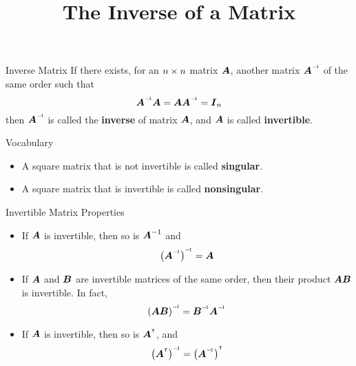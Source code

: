 \documentclass{beamer}
\title[MA245 - Section 3.3]{The Inverse of a Matrix}
\begin{document}
\begin{frame}
  \titlepage
\end{frame}

\begin{frame}
\begin{block}{Inverse Matrix}
If there exists, for an $n \times n$ matrix $\boldsymbol{A}$, another matrix $\inverseof{\mat{A}}$ of the same order such that
\begin{equation*}
\inverseof{\mat{A}}\mat{A}=\mat{A}\inverseof{\mat{A}}=\identmat{n}
\end{equation*}
then $\inverseof{\mat{A}}$ is called the \textbf{inverse} of matrix $\boldsymbol{A}$, and $\boldsymbol{A}$ is called \textbf{invertible}.
\end{block}\pause
\begin{block}{Vocabulary}
\begin{itemize}
\item A square matrix that is not invertible is called \textbf{singular}.
\item A square matrix that is invertible is called \textbf{nonsingular}.
\end{itemize}
\end{block}
\end{frame}

\begin{frame}
\begin{block}{Invertible Matrix Properties}
\begin{itemize}
\item<+-> If $\boldsymbol{A}$ is invertible, then so is $\boldsymbol{A}^{-1}$ and 
\begin{equation*}
\inverseof{\left(\inverseof{\mat{A}}\right)}=\mat{A}
\end{equation*}
\item<+-> If $\boldsymbol{A}$ and $\boldsymbol{B}$ are invertible matrices of the same order, then their product $\boldsymbol{A}\boldsymbol{B}$ is invertible. In fact,
\begin{equation*}
\inverseof{\left(\mat{A}\mat{B}\right)}=\inverseof{\mat{B}}\inverseof{\mat{A}}
\end{equation*}
\item<+-> If $\boldsymbol{A}$ is invertible, then so is $\transposeof{\mat{A}}$, and
\begin{equation*}
\inverseof{\left(\transposeof{\mat{A}}\right)}=\transposeof{\left(\inverseof{\mat{A}}\right)}
\end{equation*}
\end{itemize}
\end{block}
\end{frame}
\end{document}
